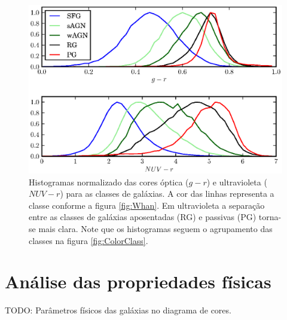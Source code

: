 \begin{figure}
	\includegraphics{figuras/histo_galtype_color.eps}
	\caption[Histogramas de cores para as classes de galáxias.]
	{Histogramas normalizado das cores óptica ($g-r$) e ultravioleta ($NUV-r$) para
	as classes de galáxias. A cor das linhas representa a classe conforme a figura
	\ref{fig:Whan}. Em ultravioleta a separação entre as classes de galáxias
	aposentadas (RG) e passivas (PG) torna-se mais clara. Note que os histogramas
	seguem o agrupamento das classes na figura \ref{fig:ColorClass}.}
	\label{fig:HistogramaCorClasse}
\end{figure}


\section{Análise das propriedades físicas}

TODO: Parâmetros físicos das galáxias no diagrama de cores.


